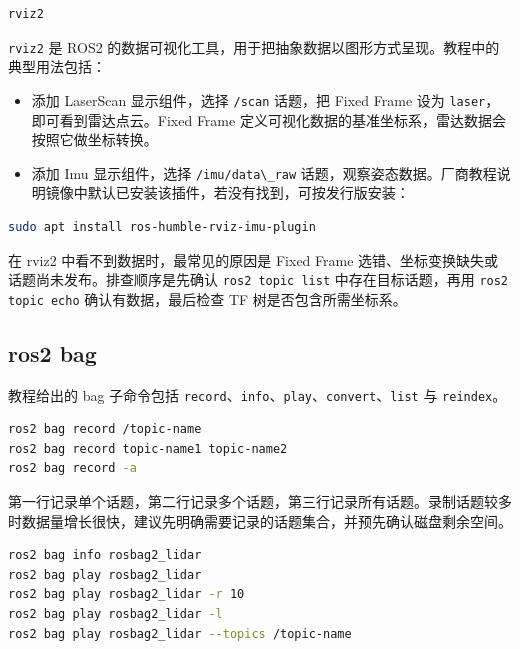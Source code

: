 \begin{lstlisting}[language=bash]
rviz2
\end{lstlisting}

\passthrough{\lstinline!rviz2!} 是 ROS2
的数据可视化工具，用于把抽象数据以图形方式呈现。教程中的典型用法包括：

\begin{itemize}
\tightlist
\item
  添加 LaserScan 显示组件，选择 \passthrough{\lstinline!/scan!} 话题，把
  Fixed Frame 设为
  \passthrough{\lstinline!laser!}，即可看到雷达点云。Fixed Frame
  定义可视化数据的基准坐标系，雷达数据会按照它做坐标转换。
\item
  添加 Imu 显示组件，选择 \passthrough{\lstinline!/imu/data\_raw!}
  话题，观察姿态数据。厂商教程说明镜像中默认已安装该插件，若没有找到，可按发行版安装：
\end{itemize}

\begin{lstlisting}[language=bash]
sudo apt install ros-humble-rviz-imu-plugin
\end{lstlisting}

在 rviz2 中看不到数据时，最常见的原因是 Fixed Frame
选错、坐标变换缺失或话题尚未发布。排查顺序是先确认
\passthrough{\lstinline!ros2 topic list!} 中存在目标话题，再用
\passthrough{\lstinline!ros2 topic echo!} 确认有数据，最后检查 TF
树是否包含所需坐标系。

\subsection{ros2 bag}\label{ros2-bag}

教程给出的 bag 子命令包括
\passthrough{\lstinline!record!}、\passthrough{\lstinline!info!}、\passthrough{\lstinline!play!}、\passthrough{\lstinline!convert!}、\passthrough{\lstinline!list!}
与 \passthrough{\lstinline!reindex!}。

\begin{lstlisting}[language=bash]
ros2 bag record /topic-name
ros2 bag record topic-name1 topic-name2
ros2 bag record -a
\end{lstlisting}

第一行记录单个话题，第二行记录多个话题，第三行记录所有话题。录制话题较多时数据量增长很快，建议先明确需要记录的话题集合，并预先确认磁盘剩余空间。

\begin{lstlisting}[language=bash]
ros2 bag info rosbag2_lidar
ros2 bag play rosbag2_lidar
ros2 bag play rosbag2_lidar -r 10
ros2 bag play rosbag2_lidar -l
ros2 bag play rosbag2_lidar --topics /topic-name
\end{lstlisting}

